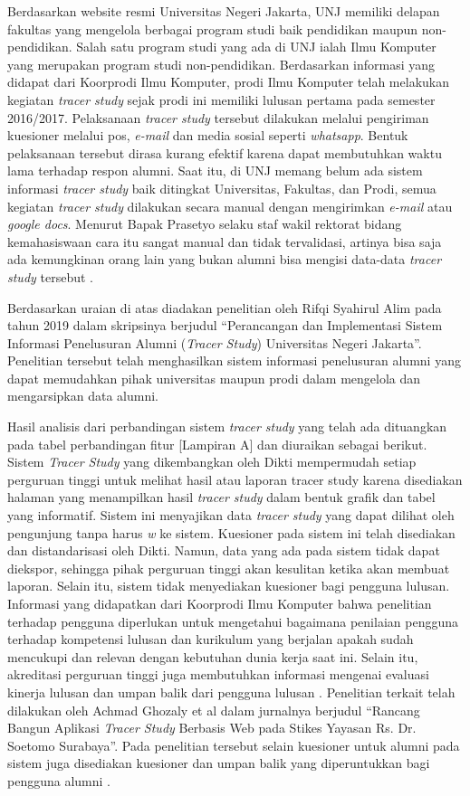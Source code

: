 Berdasarkan website resmi Universitas Negeri Jakarta, UNJ memiliki delapan fakultas yang mengelola berbagai program studi baik pendidikan maupun non-pendidikan. Salah satu program studi yang ada di UNJ ialah Ilmu Komputer yang merupakan program studi non-pendidikan. Berdasarkan informasi yang didapat dari Koorprodi Ilmu Komputer, prodi Ilmu Komputer telah melakukan kegiatan \textit{tracer study} sejak prodi ini memiliki lulusan pertama pada semester 2016/2017. Pelaksanaan \textit{tracer study} tersebut dilakukan melalui pengiriman kuesioner melalui pos, \textit{e-mail} dan media sosial seperti \textit{whatsapp}. Bentuk pelaksanaan tersebut dirasa kurang efektif karena dapat membutuhkan waktu lama terhadap respon alumni. Saat itu, di UNJ memang belum ada sistem informasi \textit{tracer study} baik ditingkat Universitas, Fakultas, dan Prodi, semua kegiatan \textit{tracer study} dilakukan secara manual dengan mengirimkan \textit{e-mail} atau \textit{google docs}. Menurut Bapak Prasetyo selaku staf wakil rektorat bidang kemahasiswaan cara itu sangat manual dan tidak tervalidasi, artinya bisa saja ada kemungkinan orang lain yang bukan alumni bisa mengisi data-data \textit{tracer study} tersebut \cite{Rifqi}. 

Berdasarkan uraian di atas diadakan penelitian oleh Rifqi Syahirul Alim pada tahun 2019 dalam skripsinya berjudul “Perancangan dan Implementasi Sistem Informasi Penelusuran Alumni (\textit{Tracer Study}) Universitas Negeri Jakarta”. Penelitian tersebut telah menghasilkan sistem informasi penelusuran alumni yang dapat memudahkan pihak universitas maupun prodi dalam mengelola dan mengarsipkan data alumni.

Hasil analisis dari perbandingan sistem \textit{tracer study} yang telah ada dituangkan pada tabel perbandingan fitur [Lampiran A] dan diuraikan sebagai berikut. Sistem \textit{Tracer Study} yang dikembangkan oleh Dikti mempermudah setiap perguruan tinggi untuk melihat hasil atau laporan tracer study karena disediakan halaman yang menampilkan hasil \textit{tracer study} dalam bentuk grafik dan tabel yang informatif. Sistem ini menyajikan data \textit{tracer study} yang dapat dilihat oleh pengunjung tanpa harus \textit{w} ke sistem. Kuesioner pada sistem ini telah disediakan dan distandarisasi oleh Dikti. Namun, data yang ada pada sistem tidak dapat diekspor, sehingga pihak perguruan tinggi akan kesulitan ketika akan membuat laporan. Selain itu, sistem tidak menyediakan kuesioner bagi pengguna lulusan. Informasi yang didapatkan dari Koorprodi Ilmu Komputer bahwa penelitian terhadap pengguna diperlukan untuk mengetahui bagaimana penilaian pengguna terhadap kompetensi lulusan dan kurikulum yang berjalan apakah sudah mencukupi dan relevan dengan kebutuhan dunia kerja saat ini. Selain itu, akreditasi perguruan tinggi juga membutuhkan informasi mengenai evaluasi kinerja lulusan dan umpan balik dari pengguna lulusan \cite{BorangIlkom}. Penelitian terkait telah dilakukan oleh Achmad Ghozaly et al dalam jurnalnya berjudul “Rancang Bangun Aplikasi \textit{Tracer Study} Berbasis Web pada Stikes Yayasan Rs. Dr. Soetomo Surabaya”. Pada penelitian tersebut selain kuesioner untuk alumni pada sistem juga disediakan kuesioner dan umpan balik yang diperuntukkan bagi pengguna alumni \cite{Ghozaly}. 

